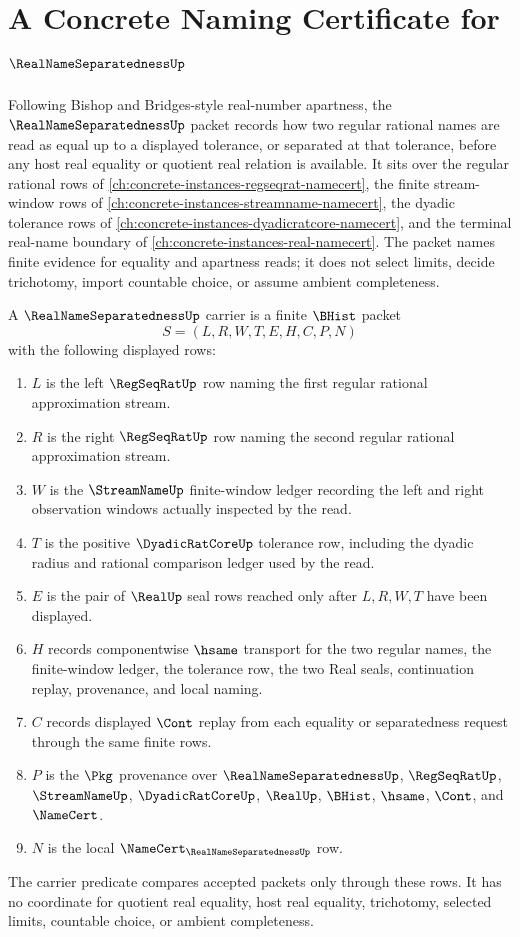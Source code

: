 \chapter{A Concrete Naming Certificate for $\RealNameSeparatednessUp$}
\label{ch:concrete-instances-real-name-separatedness-namecert}

Following Bishop and Bridges-style real-number apartness, the $\RealNameSeparatednessUp$ packet records how two regular rational names are read as equal up to a displayed tolerance, or separated at that tolerance, before any host real equality or quotient real relation is available. It sits over the regular rational rows of \autoref{ch:concrete-instances-regseqrat-namecert}, the finite stream-window rows of \autoref{ch:concrete-instances-streamname-namecert}, the dyadic tolerance rows of \autoref{ch:concrete-instances-dyadicratcore-namecert}, and the terminal real-name boundary of \autoref{ch:concrete-instances-real-namecert}. The packet names finite evidence for equality and apartness reads; it does not select limits, decide trichotomy, import countable choice, or assume ambient completeness.

\begin{definition}
\label{def:real-name-separatedness-carrier}
A $\RealNameSeparatednessUp$ carrier is a finite $\BHist$ packet
$$
S=(L,R,W,T,E,H,C,P,N)
$$
with the following displayed rows:
\begin{enumerate}
\item $L$ is the left $\RegSeqRatUp$ row naming the first regular rational approximation stream.
\item $R$ is the right $\RegSeqRatUp$ row naming the second regular rational approximation stream.
\item $W$ is the $\StreamNameUp$ finite-window ledger recording the left and right observation windows actually inspected by the read.
\item $T$ is the positive $\DyadicRatCoreUp$ tolerance row, including the dyadic radius and rational comparison ledger used by the read.
\item $E$ is the pair of $\RealUp$ seal rows reached only after $L,R,W,T$ have been displayed.
\item $H$ records componentwise $\hsame$ transport for the two regular names, the finite-window ledger, the tolerance row, the two Real seals, continuation replay, provenance, and local naming.
\item $C$ records displayed $\Cont$ replay from each equality or separatedness request through the same finite rows.
\item $P$ is the $\Pkg$ provenance over $\RealNameSeparatednessUp$, $\RegSeqRatUp$, $\StreamNameUp$, $\DyadicRatCoreUp$, $\RealUp$, $\BHist$, $\hsame$, $\Cont$, and $\NameCert$.
\item $N$ is the local $\NameCert_{\RealNameSeparatednessUp}$ row.
\end{enumerate}
The carrier predicate compares accepted packets only through these rows. It has no coordinate for quotient real equality, host real equality, trichotomy, selected limits, countable choice, or ambient completeness.
\end{definition}

